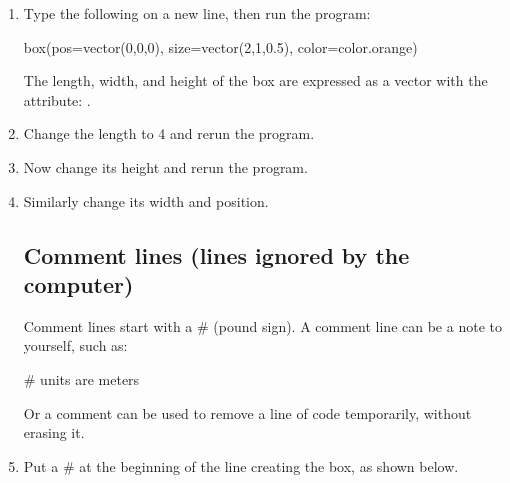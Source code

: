 \begin{enumerate}

	\item Type the following on a new line, then run the program:

\begin{myvpython}
box(pos=vector(0,0,0), size=vector(2,1,0.5), color=color.orange)
\end{myvpython}

The length, width, and height of the box are expressed as a vector with the attribute: .  

	\item Change the length to 4 and rerun the program.
	
	\item Now change its height and rerun the program.
	
	\item Similarly change its width and position.


	\subsection*{Comment lines (lines ignored by the computer)}

Comment lines start with a \# (pound sign). 
A comment line can be a note to yourself, such as:

\begin{myvpython}
# units are meters
\end{myvpython}

Or a comment can be used to remove a line of code temporarily, without erasing it.

	\item Put a \# at the beginning of the line creating the box, as shown below.


\end{enumerate}
